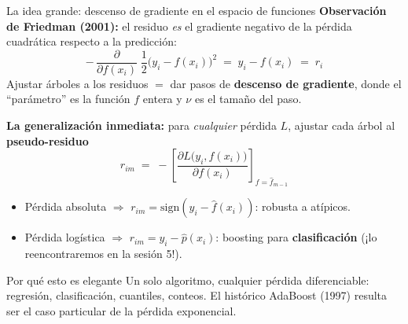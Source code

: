 \documentclass{beamer}
\newcommand{\1}{\mathbb{I}}
\begin{document}
\begin{frame}{La idea grande: descenso de gradiente en el espacio de funciones}
\small
\textbf{Observación de Friedman (2001):} el residuo \emph{es} el gradiente negativo de la pérdida cuadrática respecto a la predicción:
\[ -\,\frac{\partial}{\partial f(x_i)} \; \frac{1}{2}\big( y_i - f(x_i) \big)^2 \;=\; y_i - f(x_i) \;=\; r_i \]
\pause
Ajustar árboles a los residuos $=$ dar pasos de \textbf{descenso de gradiente}, donde el ``parámetro'' es la función $f$ entera y $\nu$ es el tamaño del paso.
\pause

\vspace{0.15cm}
\textbf{La generalización inmediata:} para \emph{cualquier} pérdida $L$, ajustar cada árbol al \textbf{pseudo-residuo}
\[ r_{im} \;=\; -\left[ \frac{\partial L\big(y_i, f(x_i)\big)}{\partial f(x_i)} \right]_{f = \hat{f}_{m-1}} \]
\pause
\begin{itemize}\itemsep4pt
  \item Pérdida absoluta $\Rightarrow$ $r_{im} = \mathrm{sign}(y_i - \hat{f}(x_i))$: robusta a atípicos.
  \item Pérdida logística $\Rightarrow$ $r_{im} = y_i - \hat{p}(x_i)$: boosting para \textbf{clasificación} (¡lo reencontraremos en la sesión 5!).
\end{itemize}
\pause

\begin{block}{Por qué esto es elegante}
Un solo algoritmo, cualquier pérdida diferenciable: regresión, clasificación, cuantiles, conteos. El histórico AdaBoost (1997) resulta ser el caso particular de la pérdida exponencial.
\end{block}
\end{frame}
\end{document}
